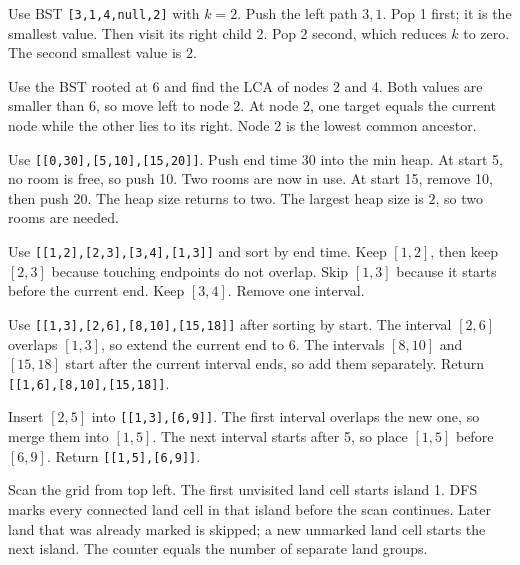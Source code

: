 \expandafter\def\csname lessontrace@35\endcsname{\visualtrace
  {Use BST \texttt{[3,1,4,null,2]} with \(k=2\). Push the left path \(3,1\).}
  {Pop 1 first; it is the smallest value. Then visit its right child 2.}
  {Pop 2 second, which reduces \(k\) to zero.}
  {The second smallest value is \(2\).}}

\expandafter\def\csname lessontrace@36\endcsname{\visualtrace
  {Use the BST rooted at 6 and find the LCA of nodes 2 and 4.}
  {Both values are smaller than 6, so move left to node 2.}
  {At node 2, one target equals the current node while the other lies to its right.}
  {Node 2 is the lowest common ancestor.}}

\expandafter\def\csname lessontrace@37\endcsname{\visualtrace
  {Use \texttt{[[0,30],[5,10],[15,20]]}. Push end time 30 into the min heap.}
  {At start 5, no room is free, so push 10. Two rooms are now in use.}
  {At start 15, remove 10, then push 20. The heap size returns to two.}
  {The largest heap size is \(2\), so two rooms are needed.}}

\expandafter\def\csname lessontrace@38\endcsname{\visualtrace
  {Use \texttt{[[1,2],[2,3],[3,4],[1,3]]} and sort by end time.}
  {Keep \([1,2]\), then keep \([2,3]\) because touching endpoints do not overlap.}
  {Skip \([1,3]\) because it starts before the current end. Keep \([3,4]\).}
  {Remove one interval.}}

\expandafter\def\csname lessontrace@39\endcsname{\visualtrace
  {Use \texttt{[[1,3],[2,6],[8,10],[15,18]]} after sorting by start.}
  {The interval \([2,6]\) overlaps \([1,3]\), so extend the current end to 6.}
  {The intervals \([8,10]\) and \([15,18]\) start after the current interval ends, so add them separately.}
  {Return \texttt{[[1,6],[8,10],[15,18]]}.}}

\expandafter\def\csname lessontrace@40\endcsname{\visualtrace
  {Insert \([2,5]\) into \texttt{[[1,3],[6,9]]}.}
  {The first interval overlaps the new one, so merge them into \([1,5]\).}
  {The next interval starts after 5, so place \([1,5]\) before \([6,9]\).}
  {Return \texttt{[[1,5],[6,9]]}.}}

\expandafter\def\csname lessontrace@41\endcsname{\visualtrace
  {Scan the grid from top left. The first unvisited land cell starts island 1.}
  {DFS marks every connected land cell in that island before the scan continues.}
  {Later land that was already marked is skipped; a new unmarked land cell starts the next island.}
  {The counter equals the number of separate land groups.}}

